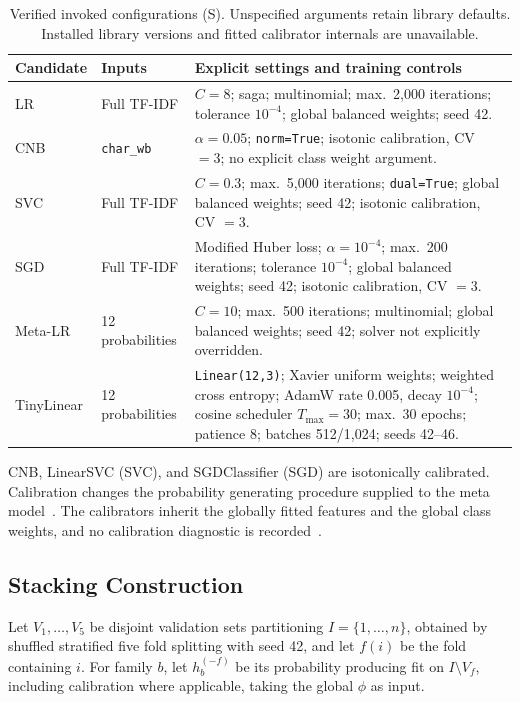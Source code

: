 \documentclass[runningheads]{llncs}
\begin{document}
\begin{table}[t]
\centering
\caption{Verified invoked configurations (S). Unspecified arguments retain library defaults. Installed library versions and fitted calibrator internals are unavailable.}
\label{tab:configs}
\begin{tabular}{llP{6.2cm}}
\toprule
Candidate & Inputs & Explicit settings and training controls \\
\midrule
LR & Full TF-IDF & $C = 8$; saga; multinomial; max.\ 2,000 iterations; tolerance $10^{-4}$; global balanced weights; seed 42. \\
CNB & \texttt{char\_wb} & $\alpha = 0.05$; \texttt{norm=True}; isotonic calibration, CV $= 3$; no explicit class weight argument. \\
SVC & Full TF-IDF & $C = 0.3$; max.\ 5,000 iterations; \texttt{dual=True}; global balanced weights; seed 42; isotonic calibration, CV $= 3$. \\
SGD & Full TF-IDF & Modified Huber loss; $\alpha = 10^{-4}$; max.\ 200 iterations; tolerance $10^{-4}$; global balanced weights; seed 42; isotonic calibration, CV $= 3$. \\
Meta-LR & 12 probabilities & $C = 10$; max.\ 500 iterations; multinomial; global balanced weights; seed 42; solver not explicitly overridden. \\
TinyLinear & 12 probabilities & \texttt{Linear(12,3)}; Xavier uniform weights; weighted cross entropy; AdamW rate 0.005, decay $10^{-4}$; cosine scheduler $T_{\max} = 30$; max.\ 30 epochs; patience 8; batches 512/1,024; seeds 42--46. \\
\bottomrule
\end{tabular}
\end{table}


CNB, LinearSVC (SVC), and SGDClassifier (SGD) are isotonically calibrated. Calibration changes the probability generating procedure supplied to the meta model~\cite{niculescu2005predicting}. The calibrators inherit the globally fitted features and the global class weights, and no calibration diagnostic is recorded~\cite{vaicenavicius2019evaluating}.

\subsection{Stacking Construction}

Let $V_1, \dots, V_5$ be disjoint validation sets partitioning $I = \{1, \dots, n\}$, obtained by shuffled stratified five fold splitting with seed 42, and let $f(i)$ be the fold containing $i$. For family $b$, let $h^{(-f)}_b$ be its probability producing fit on $I \setminus V_f$, including calibration where applicable, taking the global $\phi$ as input.
\end{document}
